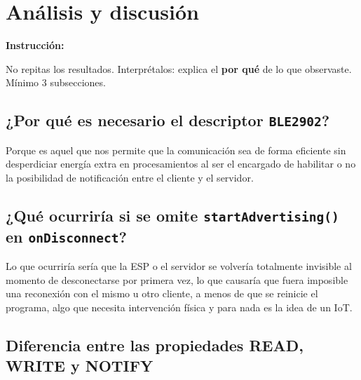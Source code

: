 \documentclass[12pt, letterpaper]{article}
\newenvironment{instruccion}{%
  \begin{mdframed}[
    backgroundcolor = tealLight,
    linecolor       = tealMain,
    linewidth       = 1pt,
    innerleftmargin = 10pt, innerrightmargin = 10pt,
    innertopmargin  = 6pt,  innerbottommargin= 6pt
  ]
  \small\color{tealMain}\textbf{Instrucción:}\hspace{4pt}\color{black}
}{%
  \end{mdframed}
}
\begin{document}
\section{Análisis y discusión}

\begin{instruccion}
  No repitas los resultados. Interprétalos: explica el \textbf{por qué}
  de lo que observaste. Mínimo 3 subsecciones.
\end{instruccion}

\subsection{¿Por qué es necesario el descriptor \texttt{BLE2902}?}

Porque es aquel que nos permite que la comunicación sea de forma eficiente sin desperdiciar energía extra en procesamientos al ser el encargado de habilitar o no la posibilidad de notificación entre el cliente y el servidor.
 
\subsection{¿Qué ocurriría si se omite \texttt{startAdvertising()} en \texttt{onDisconnect}?}

Lo que ocurriría sería que la ESP o el servidor se volvería totalmente invisible al momento de desconectarse por primera vez, lo que causaría que fuera imposible una reconexión con el mismo u otro cliente, a menos de que se reinicie el programa, algo que necesita intervención física y para nada es la idea de un IoT.

\subsection{Diferencia entre las propiedades READ, WRITE y NOTIFY}
\end{document}
